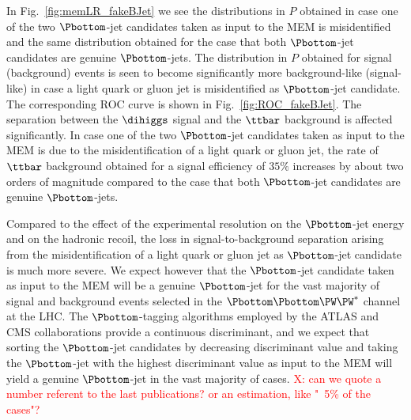 In Fig.~\ref{fig:memLR_fakeBJet} we see the distributions in $P$ obtained in case one of the two $\Pbottom$-jet candidates taken as input to the MEM 
is  misidentified and the same distribution obtained for the case that both $\Pbottom$-jet candidates are genuine $\Pbottom$-jets. 
The distribution in $P$ obtained for signal (background) events is seen to become significantly more background-like (signal-like) 
in case a light quark or gluon jet is misidentified as $\Pbottom$-jet candidate.
The corresponding ROC curve is shown in Fig.~\ref{fig:ROC_fakeBJet}.
The separation between the $\dihiggs$ signal and the $\ttbar$ background is affected significantly.
In case one of the two $\Pbottom$-jet candidates taken as input to the MEM is due to the misidentification of a light quark or gluon jet,
the rate of $\ttbar$ background obtained for a signal efficiency of $35\%$ increases by about two orders of magnitude 
compared to the case that both $\Pbottom$-jet candidates are genuine $\Pbottom$-jets.

Compared to the effect of the experimental resolution on the $\Pbottom$-jet energy and on the hadronic recoil,
the loss in signal-to-background separation arising from the misidentification of a light quark or gluon jet as $\Pbottom$-jet candidate
is much more severe. 
We expect however that the $\Pbottom$-jet candidate taken as input to the MEM will be a genuine $\Pbottom$-jet for the vast majority of signal and background events
selected in the $\Pbottom\Pbottom\PW\PW^{*}$ channel at the LHC.
The $\Pbottom$-tagging algorithms employed by the ATLAS and CMS collaborations provide a continuous discriminant, 
and we expect that sorting the $\Pbottom$-jet candidates by decreasing discriminant value and taking the $\Pbottom$-jet with the highest discriminant value as input to the MEM
will yield a genuine $\Pbottom$-jet in the vast majority of cases. \textcolor{red}{X: can we quote a number referent to the last publications? or an estimation, like "~5\% of the cases"?} 


